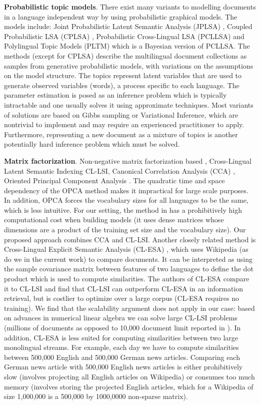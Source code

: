 \documentclass[twoside,11pt]{article}
\begin{document}
\textbf{Probabilistic topic models}. There exist many variants to modelling documents in a language independent way by using probabilistic graphical models. The models include:  Joint Probabilistic Latent Semantic Analysis (JPLSA) , Coupled Probabilistic LSA (CPLSA) \cite{platt2010translingual}, Probabilistic Cross-Lingual LSA (PCLLSA)\cite{PCL_LSA} and Polylingual Topic Models (PLTM)  which is a Bayesian version of PCLLSA. The methods (except for CPLSA) describe the multilingual document collections as samples from generative probabilistic models, with variations on the assumptions on the model structure. The topics represent latent variables that are used to generate observed variables (words), a process specific to each language. The parameter estimation is posed as an inference problem which is typically intractable and one usually solves it using approximate techniques. Most variants of solutions are based on Gibbs sampling or Variational Inference, which are nontrivial to implement and may require an experienced practitioner to apply. Furthermore, representing a new document as a mixture of topics is another potentially hard inference problem which must be solved.

\textbf{Matrix factorization}. Non-negative matrix factorization based \cite{nonnegfactor_lsi}, Cross-Lingual Latent Semantic Indexing CL-LSI\cite{multilingualBook}, Canonical Correlation Analysis (CCA) \cite{Hotelling}, Oriented Principal Component Analysis \cite{platt2010translingual}. The quadratic time and space dependency of the OPCA method makes it impractical for large scale purposes. In addition, OPCA forces the vocabulary sizes for all languages to be the same, which is less intuitive. For our setting, the method in \cite{nonnegfactor_lsi} has a prohibitively high computational cost when building models (it uses dense matrices whose dimensions are a product of the training set size and the vocabulary size). Our proposed approach combines CCA and CL-LSI. Another closely related method is Cross-Lingual Explicit Semantic Analysis (CL-ESA) \cite{ESA}, which uses Wikipedia (as do we in the current work) to compare documents. It can be interpreted as using the sample covariance matrix between features of two languages to define the dot product which is used to compute similarities.
The authors of CL-ESA compare it to CL-LSI and find that CL-LSI can outperform CL-ESA in an information retrieval, but is costlier to optimize over a large corpus (CL-ESA requires no training). We find that the scalability argument does not apply in our case: based on advances in numerical linear algebra we can solve large CL-LSI problems (millions of documents as opposed to 10,000 document limit reported in \cite{ESA}). In addition, CL-ESA is less suited for computing similarities between two large monolingual streams. For example, each day we have to compute similarities between 500,000 English and 500,000 German news articles. Comparing each German news article with 500,000 English news articles is either prohibitively slow (involves projecting all English articles on Wikipedia) or consumes too much memory (involves storing the projected English articles, which for a Wikipedia of size 1,000,000 is a 500,000 by 1000,0000 non-sparse matrix).
\end{document}
